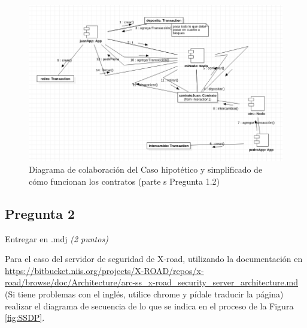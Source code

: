 \begin{figure}
    \centering
    \includegraphics[width=\textwidth]{Pictures/ejecutarcontrato.png}
    \caption{Diagrama de colaboración del Caso hipotético y simplificado de cómo funcionan los contratos (parte s Pregunta 1.2)}
    \label{fig:sc}
\end{figure}

\newpage
\subsection*{Pregunta 2}

\begin{flushright}
    Entregar en .mdj
    \textit{(2 puntos)}
\end{flushright}

Para el caso del servidor de seguridad de X-road, utilizando la documentación en \url{https://bitbucket.niis.org/projects/X-ROAD/repos/x-road/browse/doc/Architecture/arc-ss_x-road_security_server_architecture.md} (Si tiene problemas con el inglés, utilice chrome y pídale traducir la página) realizar el diagrama de secuencia de lo que se indica en el proceso de la Figura \ref{fig:SSDP}.  

